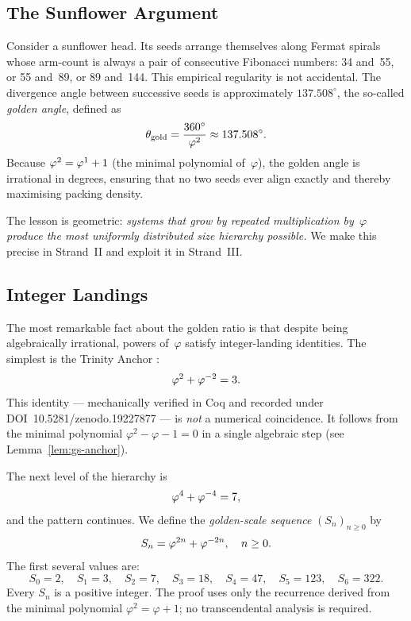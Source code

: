\subsection{The Sunflower Argument}
\label{subsec:gs-sunflower}

Consider a sunflower head.  Its seeds arrange themselves along
Fermat spirals whose arm-count is always a pair of consecutive
Fibonacci numbers: 34 and~55, or 55 and~89, or 89 and~144.  This
empirical regularity is not accidental.  The divergence angle
between successive seeds is approximately \(137.508^\circ\), the
so-called \emph{golden angle}, defined as
\[
  \theta_\text{gold}
    = \frac{360^\circ}{\varphi^{2}}
    \approx 137.508^\circ .
\]
Because \(\varphi^{2} = \varphi^{1}+1\) (the minimal polynomial of~\(\varphi\)),
the golden angle is irrational in degrees, ensuring that no two seeds
ever align exactly and thereby maximising packing density.

The lesson is geometric: \emph{systems that grow by repeated
multiplication by~\(\varphi\) produce the most uniformly distributed
size hierarchy possible.}  We make this precise in Strand~II and
exploit it in Strand~III.

\subsection{Integer Landings}
\label{subsec:gs-integer-landings}

The most remarkable fact about the golden ratio is that despite being
algebraically irrational, powers of~\(\varphi\) satisfy integer-landing
identities.  The simplest is the Trinity Anchor
\cite{zenodo_trinity_anchor}:
\[
  \varphi^{2} + \varphi^{-2} = 3 .
\]
This identity — mechanically verified in Coq and recorded under
DOI~10.5281/zenodo.19227877 — is \emph{not} a numerical coincidence.  It
follows from the minimal polynomial \(\varphi^2 - \varphi - 1 = 0\) in a
single algebraic step (see Lemma~\ref{lem:gs-anchor}).

The next level of the hierarchy is
\[
  \varphi^{4} + \varphi^{-4} = 7 ,
\]
and the pattern continues.  We define the \emph{golden-scale sequence}
\((S_n)_{n \ge 0}\) by
\[
  S_n = \varphi^{2n} + \varphi^{-2n} , \quad n \ge 0 .
\]
The first several values are:
\[
  S_0 = 2,\quad
  S_1 = 3,\quad
  S_2 = 7,\quad
  S_3 = 18,\quad
  S_4 = 47,\quad
  S_5 = 123,\quad
  S_6 = 322 .
\]
Every \(S_n\) is a positive integer.  The proof uses only the
recurrence derived from the minimal polynomial
\(\varphi^2 = \varphi + 1\); no transcendental analysis is required.

